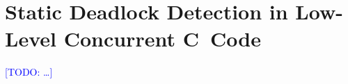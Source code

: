 \documentclass[runningheads]{llncs}
\newcommand{\todo}[1]{\textcolor{blue}{[TODO: #1]}}
\begin{document}
\section{Static Deadlock Detection in Low-Level Concurrent C~Code}

\todo{\ldots}


\end{document}
